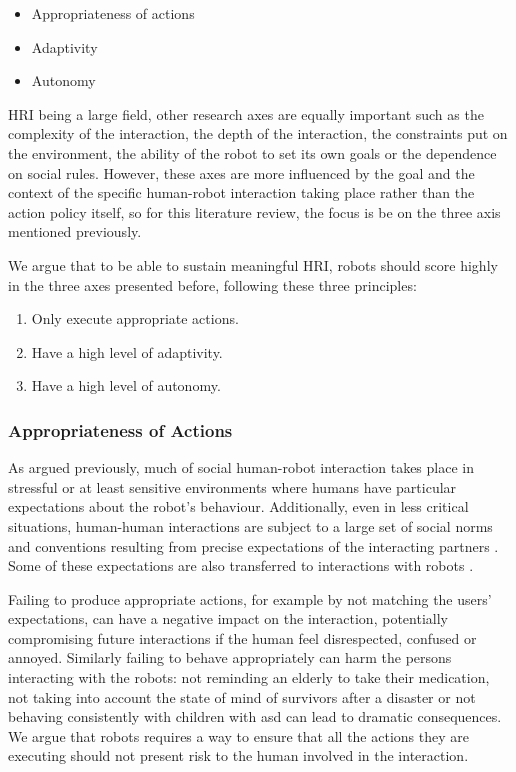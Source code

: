     \begin{itemize}
        \item Appropriateness of actions
        \item Adaptivity
        \item Autonomy
    \end{itemize}

    HRI being a large field, other research axes are equally important such as  the complexity of the interaction, the depth of the interaction, the constraints put on the environment, the ability of the robot to set its own goals or the dependence on social rules. However, these axes are more influenced by the goal and the context of the specific human-robot interaction taking place rather than the action policy itself, so for this literature review, the focus is be on the three axis mentioned previously.

    We argue that to be able to sustain meaningful HRI, robots should score highly in the three axes presented before, following these three principles:

    \begin{enumerate}
        \item Only execute appropriate actions.
        \item Have a high level of adaptivity.
        \item Have a high level of autonomy.
    \end{enumerate}

\subsubsection{Appropriateness of Actions} \label{ssec:appropriateness}
    As argued previously, much of social human-robot interaction takes place in  stressful or at least sensitive environments where humans have particular expectations about the robot's behaviour. Additionally, even in less critical situations, human-human interactions are subject to a large set of social norms and conventions resulting from precise expectations of the interacting partners \citep{sherif1936psychology}. Some of these expectations are also transferred to interactions with robots \citep{bartneck2004design}.
	
    Failing to produce appropriate actions, for example by not matching the users' expectations, can have a negative impact on the interaction, potentially compromising future interactions if the human feel disrespected, confused or annoyed. Similarly failing to behave appropriately can harm the persons interacting with the robots: not reminding an elderly to take their medication, not taking into account the state of mind of survivors after a disaster or not behaving consistently with children with \gls{asd} can lead to dramatic consequences.  We argue that robots requires a way to ensure that all the actions they are executing should not present risk to the human involved in the interaction.
	
